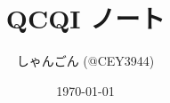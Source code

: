 \documentclass[14pt,dvipdfmx,a4paper]{jsreport}
\title{QCQI ノート}
\author{しゃんごん (@CEY3944)}
\date{\today}
\begin{document}

\maketitle
\tableofcontents







\nocite{*}
\end{document}

